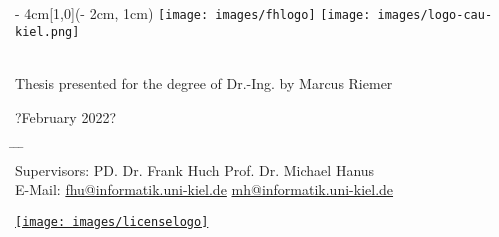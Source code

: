 
\begin{titlepage}
  \vspace*{20ex}
  \begin{textblock*}{\paperwidth - 4cm}[1,0](\paperwidth - 2cm, 1cm)
    \centering
    \texttt{[image: images/fhlogo]}
    \hfill
    \texttt{[image: images/logo-cau-kiel.png]}
  \end{textblock*}
  \begin{center}
    \sffamily{}
    {\Huge\doctitle}
    {\Large\docsubtitle} \\[4ex]
    {Thesis presented for the degree of Dr.-Ing. by Marcus Riemer}

    { ?February 2022? }
  \end{center}
  \vspace*{10ex}
  \begin{tabbing}
    \hspace{8em} \= \hspace{14em} \= \hspace{8em} \= \kill
    \\
    Supervisors: \> PD. Dr. Frank Huch  \> Prof. Dr. Michael Hanus \\
    E-Mail: \> \href{mailto:fhu@informatik.uni-kiel.de}{fhu@informatik.uni-kiel.de} \> \href{mailto:mh@informatik.uni-kiel.de}{mh@informatik.uni-kiel.de}
  \end{tabbing}
  \vfill
  \centering \href{https://creativecommons.org/licenses/by-sa/4.0/}{\texttt{[image: images/licenselogo]}}
\end{titlepage}

\restoregeometry                 %

\cleardoublepage

